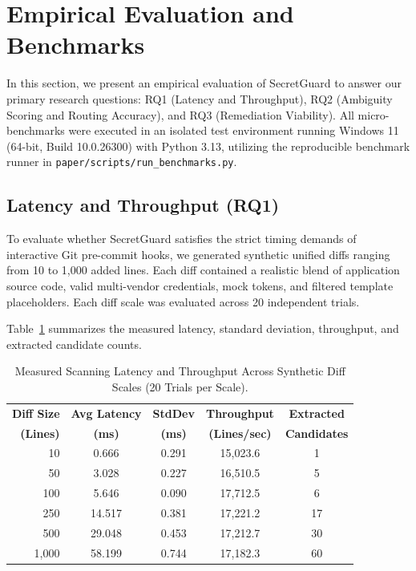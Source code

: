 \section{Empirical Evaluation and Benchmarks}
\label{sec:evaluation}

In this section, we present an empirical evaluation of SecretGuard to answer our primary research questions: RQ1 (Latency and Throughput), RQ2 (Ambiguity Scoring and Routing Accuracy), and RQ3 (Remediation Viability). All micro-benchmarks were executed in an isolated test environment running Windows 11 (64-bit, Build 10.0.26300) with Python 3.13, utilizing the reproducible benchmark runner in \texttt{paper/scripts/run\_benchmarks.py}.

\subsection{Latency and Throughput (RQ1)}
To evaluate whether SecretGuard satisfies the strict timing demands of interactive Git pre-commit hooks, we generated synthetic unified diffs ranging from 10 to 1,000 added lines. Each diff contained a realistic blend of application source code, valid multi-vendor credentials, mock tokens, and filtered template placeholders. Each diff scale was evaluated across 20 independent trials.

Table~\ref{tab:benchmarks} summarizes the measured latency, standard deviation, throughput, and extracted candidate counts.

\begin{table}[h]
\centering
\caption{Measured Scanning Latency and Throughput Across Synthetic Diff Scales (20 Trials per Scale).}
\label{tab:benchmarks}
\footnotesize
\setlength{\tabcolsep}{3pt}
\begin{tabular}{rcccc}
\toprule
\textbf{Diff Size} & \textbf{Avg Latency} & \textbf{StdDev} & \textbf{Throughput} & \textbf{Extracted} \\
\textbf{(Lines)} & \textbf{(ms)} & \textbf{(ms)} & \textbf{(Lines/sec)} & \textbf{Candidates} \\
\midrule
10   & 0.666  & 0.291 & 15,023.6 & 1  \\
50   & 3.028  & 0.227 & 16,510.5 & 5  \\
100  & 5.646  & 0.090 & 17,712.5 & 6  \\
250  & 14.517 & 0.381 & 17,221.2 & 17 \\
500  & 29.048 & 0.453 & 17,212.7 & 30 \\
1,000 & 58.199 & 0.744 & 17,182.3 & 60 \\
\bottomrule
\end{tabular}
\end{table}

